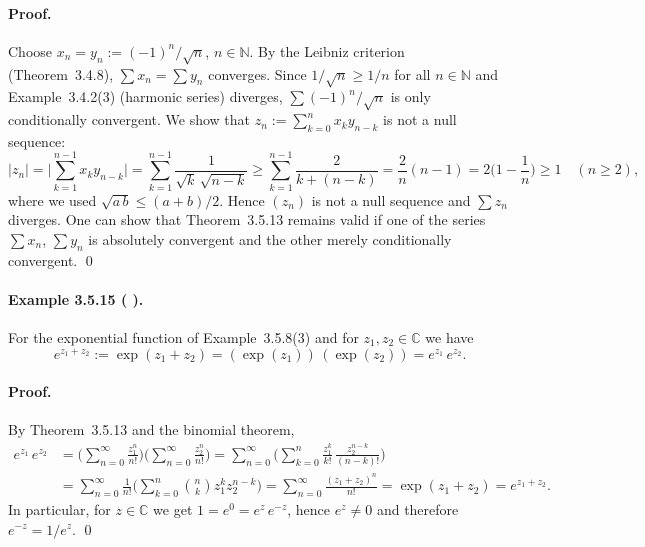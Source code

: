 \documentclass[12pt]{article}
\newcommand{\N}{\mathbb{N}}
\newcommand{\C}{\mathbb{C}}
\newcommand{\NumberedExample}[3]{%
\paragraph*{Example #1 ( #2 ).} #3\par}
\begin{document}
	\paragraph{Proof.}
	Choose $x_n=y_n:=(-1)^n/\sqrt{n}$, $n\in\N$. By the Leibniz criterion (Theorem~3.4.8), $\sum x_n = \sum y_n$ converges. Since $1/\sqrt{n} \ge 1/n$ for all $n\in\N$ and Example~3.4.2(3) (harmonic series) diverges, $\sum (-1)^n/\sqrt{n}$ is only conditionally convergent. We show that $z_n := \sum_{k=0}^{n} x_k y_{n-k}$ is not a null sequence:
	\[
		|z_n| = \Bigg| \sum_{k=1}^{n-1} x_k y_{n-k} \Bigg| = \sum_{k=1}^{n-1} \frac{1}{\sqrt{k}\,\sqrt{n-k}} 
			\ge \sum_{k=1}^{n-1} \frac{2}{k+(n-k)} = \frac{2}{n}(n-1) = 2\Big(1-\frac{1}{n}\Big) \ge 1 \quad (n\ge2),
	\]
	where we used $\sqrt{a\,b} \le (a+b)/2$. Hence $(z_n)$ is not a null sequence and $\sum z_n$ diverges. One can show that Theorem~3.5.13 remains valid if one of the series $\sum x_n$, $\sum y_n$ is absolutely convergent and the other merely conditionally convergent. \qed

	\NumberedExample{3.5.15}{}{For the exponential function of Example~3.5.8(3) and for $z_1,z_2\in\C$ we have
	\[
		e^{z_1+z_2} := \exp(z_1+z_2) = (\exp(z_1))\,(\exp(z_2)) = e^{z_1}\,e^{z_2}.
	\]}
	\paragraph{Proof.}
	By Theorem~3.5.13 and the binomial theorem,
	\begin{align*}
		e^{z_1}\,e^{z_2}
			&= \Big( \sum_{n=0}^{\infty} \frac{z_1^{n}}{n!} \Big)
				 \Big( \sum_{n=0}^{\infty} \frac{z_2^{n}}{n!} \Big)
			 = \sum_{n=0}^{\infty} \Big( \sum_{k=0}^{n} \frac{z_1^{k}}{k!}\,\frac{z_2^{n-k}}{(n-k)!} \Big) \\
			&= \sum_{n=0}^{\infty} \frac{1}{n!} \Big( \sum_{k=0}^{n} \binom{n}{k} z_1^{k} z_2^{n-k} \Big)
			 = \sum_{n=0}^{\infty} \frac{(z_1+z_2)^n}{n!}
			 = \exp(z_1+z_2) = e^{z_1+z_2}.
	\end{align*}
	In particular, for $z\in\C$ we get $1 = e^{0} = e^{z}\,e^{-z}$, hence $e^{z}\ne0$ and therefore $e^{-z} = 1/e^{z}$. \qed
	
\end{document}
